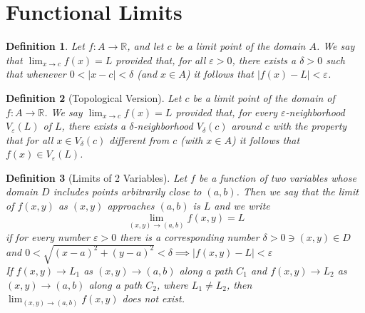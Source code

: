 \documentclass[10pt]{report}
\newtheorem{def2}{Definition}[section]
\newcommand{\eps}{\varepsilon}
\begin{document}
\section{Functional Limits}
\begin{def2}
Let $f:A\to\mathbb{R}$, and let $c$ be a limit point of the domain $A$. We say that $\lim_{x\to c}f(x)=L$ provided that, for all $\eps>0$, there exists a $\delta>0$ such that whenever $0<|x-c|<\delta$ (and $x\in A$) it follows that $|f(x)-L|<\eps$. 
\end{def2}
\begin{def2}[Topological Version]
Let $c$ be a limit point of the domain of $f:A\to\mathbb{R}$. We say $\lim_{x\to c}f(x)=L$ provided that, for every $\eps$-neighborhood $V_\eps(L)$ of $L$, there exists a $\delta$-neighborhood $V_\delta(c)$ around $c$ with the property that for all $x\in V_\delta(c)$ different from $c$ (with $x\in A$) it follows that $f(x)\in V_\eps(L)$.
\end{def2}
\begin{def2}[Limits of 2 Variables]
Let $f$ be a function of two variables whose domain $D$ includes points arbitrarily close to $(a,b)$. Then we say that the limit of $f(x,y)$ as $(x,y)$ approaches $(a,b)$ is $L$ and we write
$$\lim_{(x,y)\to (a,b)} f(x,y)=L$$
if for every number $\eps > 0$ there is a corresponding number $\delta >0 \ni (x,y)\in D$ and  $0< \sqrt{(x-a)^2+(y-a)^2}<\delta \implies |f(x,y)-L|<\eps$\\
If $f(x,y)\to L_1$ as $(x,y)\to (a,b)$ along a path $C_1$ and $f(x,y)\to L_2$ as $(x,y)\to (a,b)$ along a path $C_2$, where $L_1 \neq L_2$, then $\lim_{(x,y)\to (a,b)}f(x,y)$ does not exist.
\end{def2}
\end{document}
